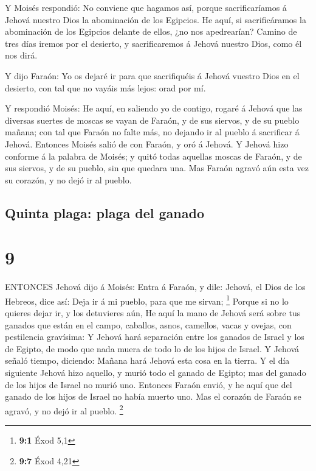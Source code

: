  Y Moisés respondió: No conviene que hagamos así, porque
sacrificaríamos á Jehová nuestro Dios la abominación de los Egipcios. He
aquí, si sacrificáramos la abominación de los Egipcios delante de ellos,
¿no nos apedrearían?  Camino de tres días iremos por el
desierto, y sacrificaremos á Jehová nuestro Dios, como él nos dirá.

 Y dijo Faraón: Yo os dejaré ir para que sacrifiquéis á
Jehová vuestro Dios en el desierto, con tal que no vayáis más lejos:
orad por mí.

 Y respondió Moisés: He aquí, en saliendo yo de contigo,
rogaré á Jehová que las diversas suertes de moscas se vayan de Faraón, y
de sus siervos, y de su pueblo mañana; con tal que Faraón no falte más,
no dejando ir al pueblo á sacrificar á Jehová.  Entonces
Moisés salió de con Faraón, y oró á Jehová.  Y Jehová hizo
conforme á la palabra de Moisés; y quitó todas aquellas moscas de
Faraón, y de sus siervos, y de su pueblo, sin que quedara una.
 Mas Faraón agravó aún esta vez su corazón, y no dejó ir al
pueblo.

\hypertarget{quinta-plaga-plaga-del-ganado}{%
\subsection{Quinta plaga: plaga del
ganado}\label{quinta-plaga-plaga-del-ganado}}

\hypertarget{section-8}{%
\section{9}\label{section-8}}

 ENTONCES Jehová dijo á Moisés: Entra á Faraón, y dile:
Jehová, el Dios de los Hebreos, dice así: Deja ir á mi pueblo, para que
me sirvan; \footnote{\textbf{9:1} Éxod 5,1}  Porque si no lo
quieres dejar ir, y los detuvieres aún,  He aquí la mano de
Jehová será sobre tus ganados que están en el campo, caballos, asnos,
camellos, vacas y ovejas, con pestilencia gravísima:  Y
Jehová hará separación entre los ganados de Israel y los de Egipto, de
modo que nada muera de todo lo de los hijos de Israel.  Y
Jehová señaló tiempo, diciendo: Mañana hará Jehová esta cosa en la
tierra.  Y el día siguiente Jehová hizo aquello, y murió
todo el ganado de Egipto; mas del ganado de los hijos de Israel no murió
uno.  Entonces Faraón envió, y he aquí que del ganado de los
hijos de Israel no había muerto uno. Mas el corazón de Faraón se agravó,
y no dejó ir al pueblo. \footnote{\textbf{9:7} Éxod 4,21}

